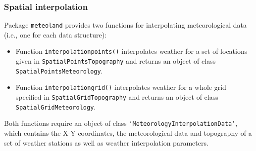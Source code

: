 \documentclass[11pt,a4paper]{article}
\begin{document}
\subsubsection{Spatial interpolation}
Package \texttt{meteoland} provides two functions for interpolating meteorological data (i.e., one for each data structure):
\begin{itemize}
\item{Function \texttt{interpolationpoints()} interpolates weather for a set of locations given in \texttt{SpatialPointsTopography} and returns an object of class \texttt{SpatialPointsMeteorology}.}
\item{Function \texttt{interpolationgrid()} interpolates weather for a whole grid specified in \texttt{SpatialGridTopography} and returns an object of class \texttt{SpatialGridMeteorology}.}
\end{itemize}
Both functions require an object of class \texttt{`MeteorologyInterpolationData'}, which contains the X-Y coordinates, the meteorological data and topography of a set of weather stations as well as weather interpolation parameters.
\end{document}
